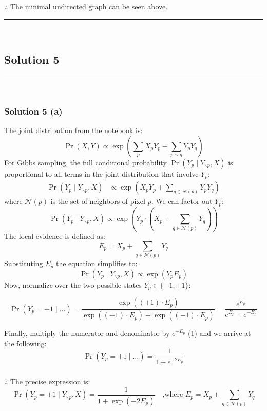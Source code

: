 \documentclass{article}
\begin{document}
\subsubsection*{\normalfont}{$\therefore$ The minimal undirected graph can be seen above.}

\noindent\rule{\textwidth}{0.4pt}\\

\newpage

\subsection*{Solution 5}
\noindent\rule{\textwidth}{0.4pt}\\
\subsubsection*{Solution 5 (a)}
The joint distribution from the notebook is:
$$
\Pr(X,Y) \propto \exp\left( \sum_p X_p Y_p + \sum_{p \sim q} Y_p Y_q \right)
$$
For Gibbs sampling, the full conditional probability $\Pr(Y_p \mid Y_{\backslash p}, X)$ is proportional to all terms in the joint distribution that involve $Y_p$:
\begin{align*}
    \Pr(Y_p \mid Y_{\backslash p}, X) &\propto \exp\left( X_p Y_p + \sum_{q \in \mathcal{N}(p)} Y_p Y_q \right)
\end{align*}
where $\mathcal{N}(p)$ is the set of neighbors of pixel $p$. We can factor out $Y_p$:
$$
\Pr(Y_p \mid Y_{\backslash p}, X) \propto \exp\left( Y_p \cdot \left( X_p + \sum_{q \in \mathcal{N}(p)} Y_q \right) \right)
$$
The local evidence is defined as:
$$E_p = X_p + \sum_{q \in \mathcal{N}(p)} Y_q$$
Substituting $E_p$ the equation simplifies to:
$$
\Pr(Y_p \mid Y_{\backslash p}, X) \propto \exp( Y_p E_p )
$$
Now, normalize over the two possible states $Y_p \in \{-1, +1\}$:

$$\Pr(Y_p = +1 \mid \ldots) = \frac{\exp( (+1) \cdot E_p )}{\exp( (+1) \cdot E_p ) + \exp( (-1) \cdot E_p )} = \frac{e^{E_p}}{e^{E_p} + e^{-E_p}}$$

Finally, multiply the numerator and denominator by $e^{-E_p}$ (1) and we arrive at the following:
$$
\Pr(Y_p = +1 \mid \ldots) = \frac{1}{1 + e^{-2E_p}}
$$

\subsubsection*{\normalfont}{$\therefore$ The precise expression is:}
$$\Pr(Y_p = +1 \mid Y_{\backslash p}, X) = \frac{1}{1 + \exp(-2 E_p)} \quad \text{,where } E_p = X_p + \sum_{q \in \mathcal{N}(p)} Y_q$$
\end{document}
